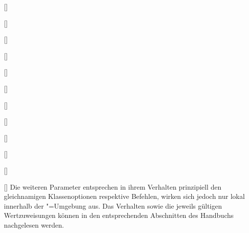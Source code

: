 \begin{Declaration}{[]}
\begin{Declaration}{[]}
\begin{Declaration}{[]}
\begin{Declaration}[v2.02]{[\PSet]}
\begin{Declaration}{[\PSet]}{%
}
\begin{Declaration}[v2.03]{[\PSet]}{%
}
\begin{Declaration}[v2.03]{[\PSet]}{%
}
\begin{Declaration}{[]}{%
}
\begin{Declaration}[v2.03]{%
  []
}{}
\begin{Declaration}[v2.02]{[\PSet]}{%
}
\begin{Declaration}[v2.02]{[\PSet]}{%
}
\begin{Declaration}[v2.02]{[\PSet]}{%
}
Die weiteren Parameter entsprechen in ihrem Verhalten prinzipiell den 
gleichnamigen Klassenoptionen respektive Befehlen, wirken sich jedoch nur lokal 
innerhalb der "=Umgebung aus. Das Verhalten sowie die 
jeweils gültigen Wertzuweisungen können in den entsprechenden Abschnitten des 
Handbuchs nachgelesen werden.
\end{Declaration}
\end{Declaration}
\end{Declaration}
\end{Declaration}
\end{Declaration}
\end{Declaration}
\end{Declaration}
\end{Declaration}
\end{Declaration}
\end{Declaration}
\end{Declaration}
\end{Declaration}



